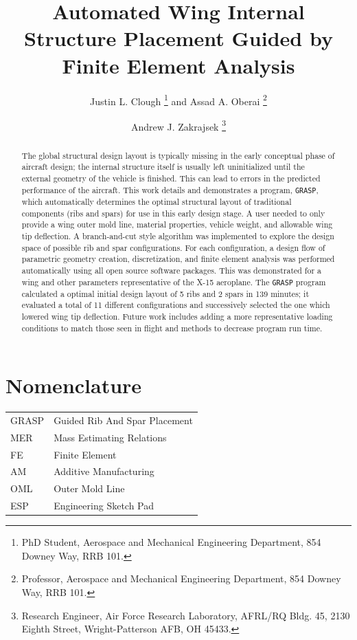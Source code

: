 \documentclass[conf]{new-aiaa}
\title{Automated Wing Internal Structure Placement Guided by Finite Element Analysis}
\author{Justin L. Clough%
        \footnote{
          PhD Student, 
          Aerospace and Mechanical Engineering Department, 
          854 Downey Way, RRB 101.}
        and Assad A. Oberai%
        \footnote{  
          Professor, 
          Aerospace and Mechanical Engineering Department, 
          854 Downey Way, RRB 101.}}
\affil{University of Southern California,
       Los Angeles, CA, 90089}
\author{Andrew J. Zakrajsek%
        \footnote{
          Research Engineer,
          Air Force Research Laboratory, AFRL/RQ
          Bldg. 45, 2130 Eighth Street,
          Wright-Patterson AFB, OH 45433.}}
\affil{AFRL/RQHV, Wright-Patterson AFB,
       Dayton, OH, 45433}
\begin{document}
\maketitle

\begin{abstract}
The global structural design layout is typically missing 
in the early conceptual phase of aircraft design;
the internal structure itself is usually left uninitialized 
until the external geometry of the vehicle is finished.
This can lead to errors in the predicted performance 
of the aircraft.
This work details and demonstrates a program, \texttt{GRASP}, 
which automatically determines the optimal structural layout 
of traditional components (ribs and spars)
for use in this early design stage.
A user needed to only provide a wing outer mold line, 
material properties, vehicle weight, and allowable wing tip deflection.
A branch-and-cut style algorithm was implemented to explore the 
design space of possible rib and spar configurations.
For each configuration, a design flow of parametric geometry 
creation, discretization, and finite element analysis
was performed automatically using all open source software packages.
This was demonstrated for a wing and other parameters 
representative of the X-15 aeroplane.
The \texttt{GRASP} program calculated a optimal initial design layout
of 5 ribs and 2 spars in 139 minutes;
it evaluated a total of 11 different configurations
and successively selected the one which lowered 
wing tip deflection.
Future work includes adding a more representative 
loading conditions to match those seen in flight
and methods to decrease program run time.
\end{abstract}

\section{Nomenclature}

{\renewcommand\arraystretch{1.0}
\noindent\begin{longtable*}{@{}l @{\quad=\quad} l@{}}
GRASP & Guided Rib And Spar Placement \\
MER   & Mass Estimating Relations \\
FE    & Finite Element \\
AM    & Additive Manufacturing \\
OML   & Outer Mold Line \\
ESP   & Engineering Sketch Pad
\end{longtable*}}
\end{document}
